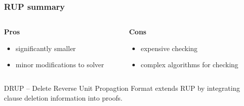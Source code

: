 \documentclass[xcolor=dvipsnames]{beamer}
\begin{document}
\begin{frame}[t]
    \frametitle{RUP summary}
    \begin{center}
    \begin{columns}[t]
	\begin{column}{0.5\textwidth}
        \textbf{Pros}
        \begin{itemize}
            \item significantly smaller
            \item minor modifications to solver
        \end{itemize}
	\end{column}
	\begin{column}{0.5\textwidth}
        \textbf{Cons}
        \begin{itemize}
            \item expensive checking
            \item complex algorithms for checking
        \end{itemize}
    \end{column}
	\end{columns}
    \end{center}

    \pause
    \bigskip
    \begin{block}{DRUP -- Delete Reverse Unit Propagtion}
        Format extends RUP by integrating clause deletion information into proofs.
    \end{block}
\end{frame}
\end{document}
